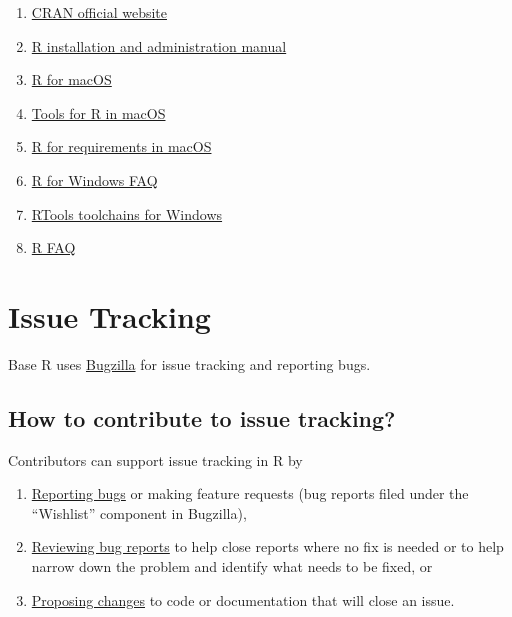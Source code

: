 \documentclass[
]{book}
\begin{document}
\begin{enumerate}
\def\labelenumi{\arabic{enumi}.}
\item
  \href{https://cran.r-project.org}{CRAN official website}
\item
  \href{https://cran.r-project.org/doc/manuals/r-patched/R-admin.html}{R installation and administration manual}
\item
  \href{https://mac.r-project.org/}{R for macOS}
\item
  \href{https://mac.r-project.org/tools/}{Tools for R in macOS}
\item
  \href{https://mac.r-project.org/src/}{R for requirements in macOS}
\item
  \href{https://cran.r-project.org/bin/windows/base/rw-FAQ.html}{R for Windows FAQ}
\item
  \href{https://cran.r-project.org/bin/windows/Rtools/}{RTools toolchains for Windows}
\item
  \href{https://cran.r-project.org/doc/FAQ/R-FAQ.html}{R FAQ}
\end{enumerate}

\chapter{Issue Tracking}\label{IssueTrack}

Base R uses \href{https://bugs.r-project.org/}{Bugzilla} for issue tracking and reporting bugs.

\section{How to contribute to issue tracking?}\label{how-to-contribute-to-issue-tracking}

Contributors can support issue tracking in R by

\begin{enumerate}
\def\labelenumi{\arabic{enumi}.}
\item
  \href{https://contributor.r-project.org/rdevguide/ReportBugs.html}{Reporting bugs} or making feature requests (bug reports filed under the ``Wishlist'' component in Bugzilla),
\item
  \href{https://contributor.r-project.org/rdevguide/ReviewBugs.html}{Reviewing bug reports} to help close reports where no fix is needed or to help narrow down the problem and identify what needs to be fixed, or
\item
  \href{https://contributor.r-project.org/rdevguide/FixBug.html\#FixBug}{Proposing changes} to code or documentation that will close an issue.
\end{enumerate}
\end{document}
